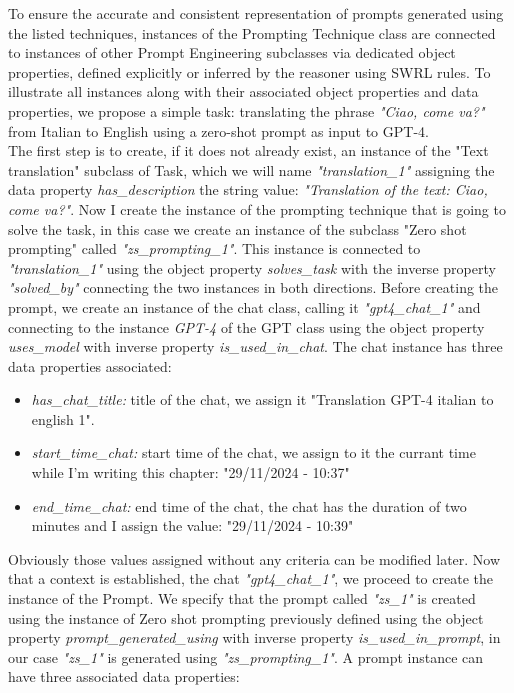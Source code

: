 To ensure the accurate and consistent representation of prompts generated using the listed techniques, instances of the Prompting Technique class are connected to instances of other Prompt Engineering subclasses via dedicated object properties, defined explicitly or inferred by the reasoner using SWRL rules. To illustrate all instances along with their associated object properties and data properties, we propose a simple task: translating the phrase \textit{"Ciao, come va?"} from Italian to English using a zero-shot prompt as input to GPT-4.\\
The first step is to create, if it does not already exist, an instance of the "Text translation" subclass of Task, which we will name \textit{"translation\_1"} assigning the data property \textit{has\_description} the string value: \textit{"Translation of the text: Ciao, come va?"}. Now I create the instance of the prompting technique that is going to solve the task, in this case we create an instance of the subclass "Zero shot prompting" called \textit{"zs\_prompting\_1"}. This instance is connected to \textit{"translation\_1"} using the object property \textit{solves\_task} with the inverse property \textit{"solved\_by"} connecting the two instances in both directions. Before creating the prompt, we create an instance of the chat class, calling it \textit{"gpt4\_chat\_1"} and connecting to the instance \textit{GPT-4} of the GPT class using the object property \textit{uses\_model} with inverse property \textit{is\_used\_in\_chat}. The chat instance has three data properties associated:
\begin{itemize}
    \item \textit{has\_chat\_title:} title of the chat, we assign it "Translation GPT-4 italian to english 1".

    \item \textit{start\_time\_chat:} start time of the chat, we assign to it the currant time while I'm writing this chapter: "29/11/2024 - 10:37"

    \item \textit{end\_time\_chat:} end time of the chat, the chat has the duration of two minutes and I assign the value: "29/11/2024 - 10:39"
\end{itemize}
Obviously those values assigned without any criteria can be modified later. Now that a context is established, the chat \textit{"gpt4\_chat\_1"}, we proceed to create the instance of the Prompt. We specify that the prompt called \textit{"zs\_1"} is created using the instance of Zero shot prompting previously defined using the object property \textit{prompt\_generated\_using} with inverse property \textit{is\_used\_in\_prompt}, in our case \textit{"zs\_1"} is generated using \textit{"zs\_prompting\_1"}. A prompt instance can have three associated data properties:
